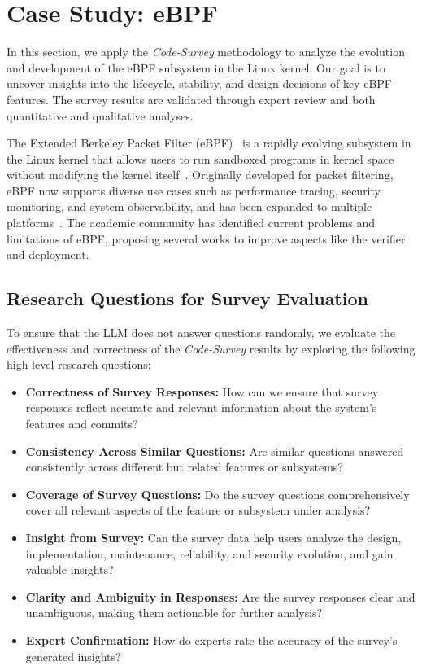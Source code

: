 \section{Case Study: eBPF}
\label{sec:analysis}

In this section, we apply the \emph{Code-Survey} methodology to analyze the evolution and development of the eBPF subsystem in the Linux kernel. Our goal is to uncover insights into the lifecycle, stability, and design decisions of key eBPF features. The survey results are validated through expert review and both quantitative and qualitative analyses.

The Extended Berkeley Packet Filter (eBPF)~\cite{ebpf} is a rapidly evolving subsystem in the Linux kernel that allows users to run sandboxed programs in kernel space without modifying the kernel itself~\cite{lim2024safebpf}. Originally developed for packet filtering, eBPF now supports diverse use cases such as performance tracing, security monitoring, and system observability, and has been expanded to multiple platforms~\cite{windows-ebpf,zheng2023bpftime}. The academic community has identified current problems and limitations of eBPF, proposing several works to improve aspects like the verifier and deployment.

\subsection{Research Questions for Survey Evaluation}

To ensure that the LLM does not answer questions randomly, we evaluate the effectiveness and correctness of the \emph{Code-Survey} results by exploring the following high-level research questions:

\begin{itemize}
    \item \textbf{Correctness of Survey Responses:} How can we ensure that survey responses reflect accurate and relevant information about the system's features and commits?
    \item \textbf{Consistency Across Similar Questions:} Are similar questions answered consistently across different but related features or subsystems?
    \item \textbf{Coverage of Survey Questions:} Do the survey questions comprehensively cover all relevant aspects of the feature or subsystem under analysis?
    \item \textbf{Insight from Survey:} Can the survey data help users analyze the design, implementation, maintenance, reliability, and security evolution, and gain valuable insights?
    \item \textbf{Clarity and Ambiguity in Responses:} Are the survey responses clear and unambiguous, making them actionable for further analysis?

    \item \textbf{Expert Confirmation:} How do experts rate the accuracy of the survey's generated insights?
\end{itemize}

